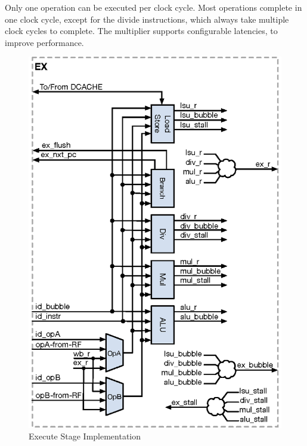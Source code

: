 Only one operation can be executed per clock cycle.
Most operations complete in one clock cycle, except for the divide instructions, which always take multiple clock cycles to complete.
The multiplier supports configurable latencies, to improve performance.


\begin{figure}[h]
  \includegraphics{assets/img/Pipeline-EX}
  \caption{Execute Stage Implementation}
\end{figure}

